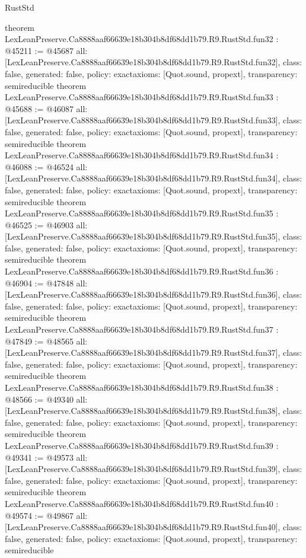 \begin{lexlean}{RustStd}
\begin{coremodule}
{}
theorem LexLeanPreserve.Ca8888aaf66639e18b304b8df68dd1b79.R9.RustStd.fun32 : @45211 := @45687 {
  all: [LexLeanPreserve.Ca8888aaf66639e18b304b8df68dd1b79.R9.RustStd.fun32],
  class: false,
  generated: false,
  policy: exact{axioms: [Quot.sound, propext]},
  transparency: semireducible
}
theorem LexLeanPreserve.Ca8888aaf66639e18b304b8df68dd1b79.R9.RustStd.fun33 : @45688 := @46087 {
  all: [LexLeanPreserve.Ca8888aaf66639e18b304b8df68dd1b79.R9.RustStd.fun33],
  class: false,
  generated: false,
  policy: exact{axioms: [Quot.sound, propext]},
  transparency: semireducible
}
theorem LexLeanPreserve.Ca8888aaf66639e18b304b8df68dd1b79.R9.RustStd.fun34 : @46088 := @46524 {
  all: [LexLeanPreserve.Ca8888aaf66639e18b304b8df68dd1b79.R9.RustStd.fun34],
  class: false,
  generated: false,
  policy: exact{axioms: [Quot.sound, propext]},
  transparency: semireducible
}
theorem LexLeanPreserve.Ca8888aaf66639e18b304b8df68dd1b79.R9.RustStd.fun35 : @46525 := @46903 {
  all: [LexLeanPreserve.Ca8888aaf66639e18b304b8df68dd1b79.R9.RustStd.fun35],
  class: false,
  generated: false,
  policy: exact{axioms: [Quot.sound, propext]},
  transparency: semireducible
}
theorem LexLeanPreserve.Ca8888aaf66639e18b304b8df68dd1b79.R9.RustStd.fun36 : @46904 := @47848 {
  all: [LexLeanPreserve.Ca8888aaf66639e18b304b8df68dd1b79.R9.RustStd.fun36],
  class: false,
  generated: false,
  policy: exact{axioms: [Quot.sound, propext]},
  transparency: semireducible
}
theorem LexLeanPreserve.Ca8888aaf66639e18b304b8df68dd1b79.R9.RustStd.fun37 : @47849 := @48565 {
  all: [LexLeanPreserve.Ca8888aaf66639e18b304b8df68dd1b79.R9.RustStd.fun37],
  class: false,
  generated: false,
  policy: exact{axioms: [Quot.sound, propext]},
  transparency: semireducible
}
theorem LexLeanPreserve.Ca8888aaf66639e18b304b8df68dd1b79.R9.RustStd.fun38 : @48566 := @49340 {
  all: [LexLeanPreserve.Ca8888aaf66639e18b304b8df68dd1b79.R9.RustStd.fun38],
  class: false,
  generated: false,
  policy: exact{axioms: [Quot.sound, propext]},
  transparency: semireducible
}
theorem LexLeanPreserve.Ca8888aaf66639e18b304b8df68dd1b79.R9.RustStd.fun39 : @49341 := @49573 {
  all: [LexLeanPreserve.Ca8888aaf66639e18b304b8df68dd1b79.R9.RustStd.fun39],
  class: false,
  generated: false,
  policy: exact{axioms: [Quot.sound, propext]},
  transparency: semireducible
}
theorem LexLeanPreserve.Ca8888aaf66639e18b304b8df68dd1b79.R9.RustStd.fun40 : @49574 := @49867 {
  all: [LexLeanPreserve.Ca8888aaf66639e18b304b8df68dd1b79.R9.RustStd.fun40],
  class: false,
  generated: false,
  policy: exact{axioms: [Quot.sound, propext]},
  transparency: semireducible
}
\end{coremodule}
\end{lexlean}
